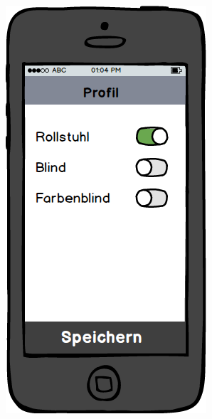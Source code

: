 \begin{figure}[ht]
\centering
\begin{minipage}[b]{.5\textwidth}
  \centering
  \includegraphics[width=.8\linewidth]{img/profil-mockup.png}
  \label{img:profil-mockup}
\end{minipage}%
\begin{minipage}[b]{.5\textwidth}
  \centering

\end{minipage}
\end{figure}

